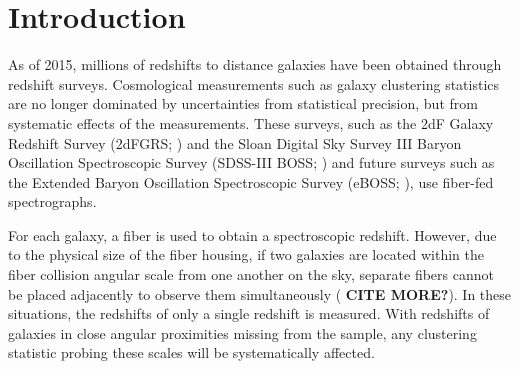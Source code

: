 \documentclass{emulateapj}
\begin{document}
\begin{abstract}

\end{abstract}

\section{Introduction} 
As of 2015, millions of redshifts to distance galaxies have been obtained through redshift surveys. Cosmological measurements such as galaxy clustering statistics are no longer dominated by uncertainties from statistical precision, but from systematic effects of the measurements. These surveys, such as the 2dF Galaxy Redshift Survey (2dFGRS; \citealt{Colless:1999aa}) and the Sloan Digital Sky Survey III Baryon Oscillation Spectroscopic Survey (SDSS-III BOSS; \citealt{Anderson:2012aa, Dawson:2013aa}) and future surveys such as the Extended Baryon Oscillation Spectroscopic Survey (eBOSS; \citealt{Dawson:2015aa}), use fiber-fed spectrographs. 

For each galaxy, a fiber is used to obtain a spectroscopic redshift. However, due to the physical size of the fiber housing, if two galaxies are located within the fiber collision angular scale from one another on the sky, separate fibers cannot be placed adjacently to observe them simultaneously (\citealt{Yoon:2008aa} {\bf CITE MORE?}). In these situations, the redshifts of only a single redshift is measured. With redshifts of galaxies in close angular proximities missing from the sample, any clustering statistic probing these scales will be systematically affected. 
\end{document}
